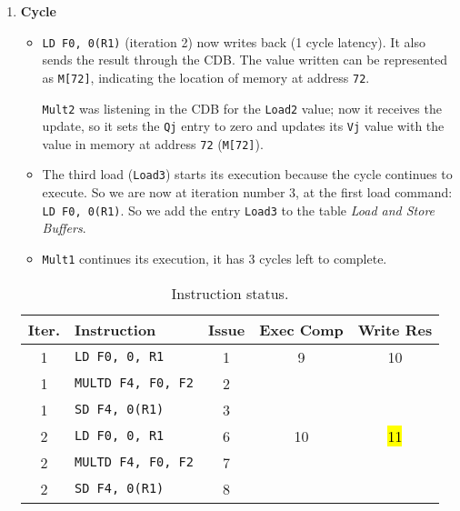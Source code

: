\begin{enumerate}
    \newpage


    \item \textbf{Cycle \theenumi}
    \begin{itemize}
        \item \texttt{LD F0, 0(R1)} (iteration 2) now writes back (1 cycle latency). It also sends the result through the CDB. The value written can be represented as \texttt{M[72]}, indicating the location of memory at address \texttt{72}.

        \texttt{Mult2} was listening in the CDB for the \texttt{Load2} value; now it receives the update, so it sets the \texttt{Qj} entry to zero and updates its \texttt{Vj} value with the value in memory at address \texttt{72} (\texttt{M[72]}).
        
        \item The third load (\texttt{Load3}) starts its execution because the cycle continues to execute. So we are now at iteration number 3, at the first load command: \texttt{LD F0, 0(R1)}. So we add the entry \texttt{Load3} to the table \emph{Load and Store Buffers}.

        \item \texttt{Mult1} continues its execution, it has 3 cycles left to complete.
    \end{itemize}
    \begin{table}[!htp]
        \centering
        \begin{tabular}{@{} c l | c c c @{}}
            \toprule
            Iter.       & Instruction                   & Issue & Exec Comp & Write Res \\
            \midrule
            1           & \texttt{LD    F0, 0, R1}      & 1     & 9         & 10        \\ [.3em]
            1           & \texttt{MULTD F4, F0, F2}     & 2     &           &           \\ [.3em]
            1           & \texttt{SD    F4, 0(R1)}      & 3     &           &           \\ [.3em]
            2           & \texttt{LD    F0, 0, R1}      & 6     & 10        & \hl{11}   \\ [.3em]
            2           & \texttt{MULTD F4, F0, F2}     & 7     &           &           \\ [.3em]
            2           & \texttt{SD    F4, 0(R1)}      & 8     &           &           \\
            \bottomrule
        \end{tabular}
        \caption*{Instruction status.}
    \end{table}


\end{enumerate}
